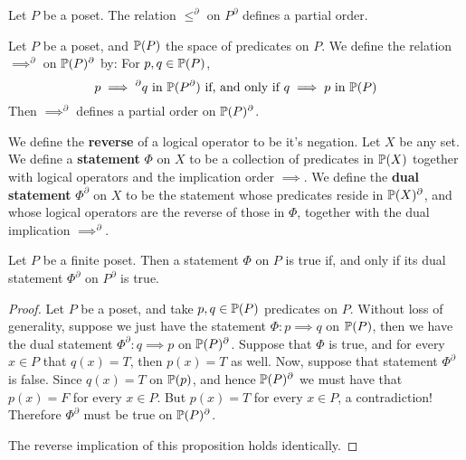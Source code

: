 \begin{lemma}\label{lemma_1.4.1}
  Let $P$ be a poset. The relation $\leq^\partial$ on  $P^\partial$
  defines a partial order.
\end{lemma}

\begin{lemma}\label{lemma_1.4.2}
  Let $P$ be a poset, and $\mathbb{P}(P)$ the space of predicates on $P$. We
  define the relation $\implies^\partial$ on $\mathbb{P}(P)^\partial$ by: For
  $p,q \in \mathbb{P}(P)$,
  \begin{equation*}
    p \implies ^\partial q \text{ in } \mathbb{P}(P^\partial) \text{ if, and
    only if }
    q \implies p \text{ in } \mathbb{P}(P)
  \end{equation*}
  Then $\implies^\partial$ defines a partial order on $\mathbb{P}(P)^\partial$.
\end{lemma}

\begin{definition}
  We define the \textbf{reverse} of a logical operator to be it's
  negation. Let $X$ be any set. We define a \textbf{statement} $\Phi$
  on $X$ to be a collection of predicates in $\mathbb{P}(X)$ together with
  logical operators and the implication order $\implies$. We define
  the \textbf{dual statement} $\Phi^\partial$ on $X$ to be the
  statement whose predicates reside in $\mathbb{P}(X)^\partial$, and whose
  logical operators are the reverse of those in $\Phi$, together with
  the dual implication $\implies^\partial$.
\end{definition}

\begin{proposition}\label{proposition_1.4.3}
  Let $P$ be a finite poset. Then a statement $\Phi$ on $P$ is true
  if, and only if its dual statement $\Phi^\partial$ on $P^\partial$
  is true.
\end{proposition}
\begin{proof}
  Let $P$ be a poset, and take $p,q \in \mathbb{P}(P)$ predicates on $P$.
  Without loss of generality, suppose we just have the statement
  $\Phi: p \implies q$ on $\mathbb{P}(P)$, then we have the dual statement
  $\Phi^\partial:q \implies p$ on $\mathbb{P}(P)^\partial$. Suppose that
  $\Phi$ is true, and for every $x \in P$ that $q(x)=T$, then $p(x)=T$
  as well. Now, suppose that statement $\Phi^\partial$ is false.
  Since $q(x)=T$ on $\mathbb{P}(p)$, and hence $\mathbb{P}(P)^\partial$ we must
  have that $p(x)=F$ for every $x \in P$. But $p(x)=T$ for every $x
  \in P$, a contradiction! Therefore $\Phi^\partial$ must be true on
  $\mathbb{P}(P)^\partial$.

  The reverse implication of this proposition holds identically.
\end{proof}

